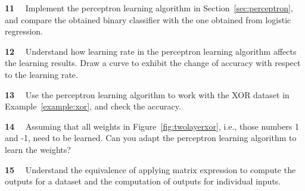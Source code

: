 
\begin{newquestion}{\textbf{11}~~}
Implement the perceptron learning algorithm in Section~\ref{sec:perceptron}, and compare the obtained binary classifier with the one obtained from logistic regression. 
\end{newquestion}

\begin{newquestion}{\textbf{12}~~}
Understand how learning rate in the perceptron learning algorithm affects the learning results. Draw a curve to exhibit the change of accuracy with respect to the learning rate. 
\end{newquestion}

\begin{newquestion}{\textbf{13}~~}
Use the perceptron learning algorithm to work with the XOR dataset in Example~\ref{example:xor}, and check the accuracy. 
\end{newquestion}




\begin{newquestion}{\textbf{14}~~}
Assuming that all weights in Figure~\ref{fig:twolayerxor}, i.e., those numbers 1 and -1, need to be learned. Can you adapt the perceptron learning algorithm to learn the weights? 
\end{newquestion}


\begin{newquestion}{\textbf{15}~~}
Understand the equivalence of applying matrix expression to compute the outputs for a dataset and the computation of outputs for individual inputs. 
\end{newquestion}